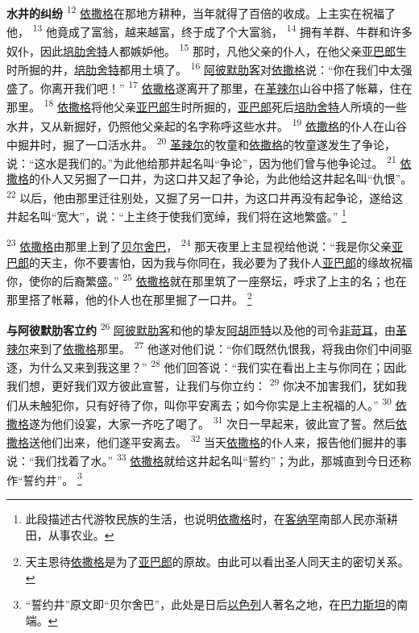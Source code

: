 \textbf{水井的纠纷\quad}
\textsuperscript{12}
\uline{依撒格}在那地方耕种，当年就得了百倍的收成。上主实在祝福了他，
\textsuperscript{13}
他竟成了富翁，越来越富，终于成了个大富翁，
\textsuperscript{14}
拥有羊群、牛群和许多奴仆，因此\uline{培肋}\uline{舍特}人都嫉妒他。
\textsuperscript{15}
那时，凡他父亲的仆人，在他父亲\uline{亚巴郎}生时所掘的井，\uline{培肋}\uline{舍特}都用土填了。
\textsuperscript{16}
\uline{阿彼默}\uline{肋客}对\uline{依撒格}说：“你在我们中太强盛了。你离开我们吧！”
\textsuperscript{17}
\uline{依撒格}遂离开了那里，在\uline{革辣尔}山谷中搭了帐幕，住在那里。
\textsuperscript{18}
\uline{依撒格}将他父亲\uline{亚巴郎}生时所掘的，\uline{亚巴郎}死后\uline{培肋}\uline{舍特}人所填的一些水井，又从新掘好，仍照他父亲起的名字称呼这些水井。
\textsuperscript{19}
\uline{依撒格}的仆人在山谷中掘井时，掘了一口活水井。
\textsuperscript{20}
\uline{革辣尔}的牧童和\uline{依撒格}的牧童遂发生了争论，说：“这水是我们的。”为此他给那井起名叫“争论”，因为他们曾与他争论过。
\textsuperscript{21}
\uline{依撒格}的仆人又另掘了一口井，为这口井又起了争论，为此他给这井起名叫“仇恨”。
\textsuperscript{22}
以后，他由那里迁往别处，又掘了另一口井，为这口井再没有起争论，遂给这井起名叫“宽大”，说：“上主终于使我们宽绰，我们将在这地繁盛。”
\footnote{此段描述古代游牧民族的生活，也说明\uline{依撒格}时，在\uline{客纳罕}南部人民亦渐耕田，从事农业。}

\textsuperscript{23}
\uline{依撒格}由那里上到了\uline{贝尔}\uline{舍巴}，
\textsuperscript{24}
那天夜里上主显视给他说：“我是你父亲\uline{亚巴郎}的天主，你不要害怕，因为我与你同在，我必要为了我仆人\uline{亚巴郎}的缘故祝福你，使你的后裔繁盛。”
\textsuperscript{25}
\uline{依撒格}就在那里筑了一座祭坛，呼求了上主的名；也在那里搭了帐幕，他的仆人也在那里掘了一口井。
\footnote{天主恩待\uline{依撒格}是为了\uline{亚巴郎}的原故。由此可以看出圣人同天主的密切关系。}

\textbf{与阿彼默肋客立约\quad}
\textsuperscript{26}
\uline{阿彼默}\uline{肋客}和他的挚友\uline{阿胡}\uline{匝特}以及他的司令\uline{非苛耳}，由\uline{革辣尔}来到了\uline{依撒格}那里。
\textsuperscript{27}
他遂对他们说：“你们既然仇恨我，将我由你们中间驱逐，为什么又来到我这里？”
\textsuperscript{28}
他们回答说：“我们实在看出上主与你同在；因此我们想，更好我们双方彼此宣誓，让我们与你立约：
\textsuperscript{29}
你决不加害我们，犹如我们从未触犯你，只有好待了你，叫你平安离去；如今你实是上主祝福的人。”
\textsuperscript{30}
\uline{依撒格}遂为他们设宴，大家一齐吃了喝了。
\textsuperscript{31}
次日一早起来，彼此宣了誓。然后\uline{依撒格}送他们出来，他们遂平安离去。
\textsuperscript{32}
当天\uline{依撒格}的仆人来，报告他们掘井的事说：“我们找着了水。”
\textsuperscript{33}
\uline{依撒格}就给这井起名叫“誓约”；为此，那城直到今日还称作“誓约井”。
\footnote{“誓约井”原文即“贝尔舍巴”，此处是日后\uline{以色列}人著名之地，在\uline{巴力斯坦}的南端。}

